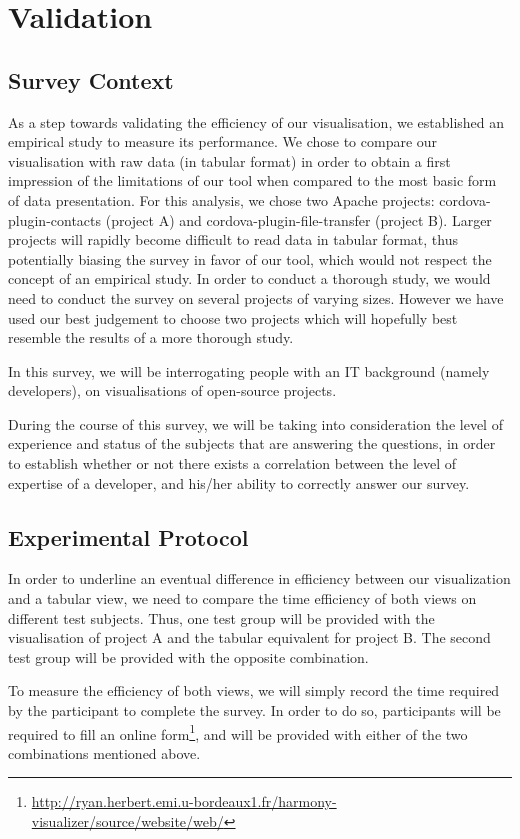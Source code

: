 \section{Validation}

\subsection{Survey Context}

As a step towards validating the efficiency of our visualisation, we established an empirical study to measure its performance.
We chose to compare our visualisation with raw data (in tabular format) in order to obtain a first impression of the limitations of our tool when compared to the most basic form of data presentation.
For this analysis, we chose two Apache projects: cordova-plugin-contacts (project A) and cordova-plugin-file-transfer (project B). Larger projects will rapidly become difficult to read data in tabular format, thus potentially biasing the survey in favor of our tool, which would not respect the concept of an empirical study. In order to conduct a thorough study, we would need to conduct the survey on several projects of varying sizes. However we have used our best judgement to choose two projects which will hopefully best resemble the results of a more thorough study.

In this survey, we will be interrogating people with an IT background (namely developers), on visualisations of open-source projects.

During the course of this survey, we will be taking into consideration the level of experience and status of the subjects that are answering the questions, in order to establish whether or not there exists a correlation between the level of expertise of a developer, and his/her ability to correctly answer our survey.


\subsection{Experimental Protocol}

In order to underline an eventual difference in efficiency between our visualization and a tabular view, we need to compare the time efficiency of both views on different test subjects. Thus, one test group will be provided with the visualisation of project A and the tabular equivalent for project B. The second test group will be provided with the opposite combination.

To measure the efficiency of both views, we will simply record the time required by the participant to complete the survey. In order to do so, participants will be required to fill an online form\footnote{\url{http://ryan.herbert.emi.u-bordeaux1.fr/harmony-visualizer/source/website/web/}}, and will be provided with either of the two combinations mentioned above.

